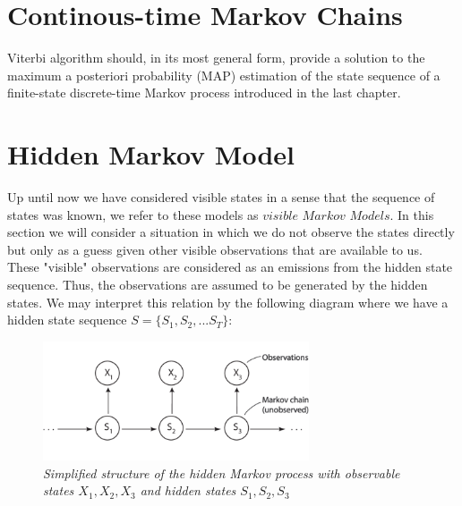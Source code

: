 \section{Continous-time Markov Chains}  %
\label{section1.3}

















Viterbi algorithm should, in its most general form, provide a solution to the maximum a posteriori probability (MAP) estimation of the state sequence of a finite-state discrete-time Markov process introduced in the last chapter. 


\section{Hidden Markov Model}

Up until now we have considered visible states in a sense that the sequence of states was known, we refer to these models as $visible$ $Markov$ $Models$. In this section we will consider a situation in which we do not observe the states directly but only as a guess given other visible observations that are available to us. These "visible" observations are considered as an emissions from the hidden state sequence. Thus, the observations are assumed to be generated by the hidden states. We may interpret this relation by the following diagram where we have a hidden state sequence $S = \{S_1, S_2,...S_T\}$:

\begin{figure}[h]

\begin{center}
	\includegraphics[width=0.7\textwidth]{States.png}
\end{center}

\caption{\textit{Simplified structure of the hidden Markov process with observable states $X_1,X_2,X_3$ and hidden states $S_1,S_2,S_3$}}

\end{figure}

